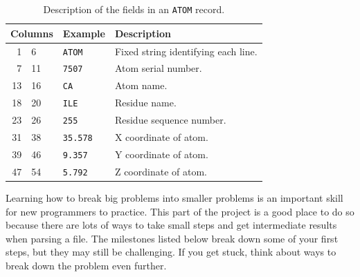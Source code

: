 \documentclass{article}
\begin{document}
\begin{table}[h]
\centering
\begin{tabular}{r@{ - }lcll}
\toprule
\multicolumn{3}{l}{Columns} & Example         & Description                         \\
\midrule
 1 &  6 & & \texttt{ATOM}   & Fixed string identifying each line. \\
 7 & 11 & & \texttt{7507}   & Atom serial number.                 \\
13 & 16 & & \texttt{CA}     & Atom name.                          \\
18 & 20 & & \texttt{ILE}    & Residue name.                       \\
23 & 26 & & \texttt{255}    & Residue sequence number.            \\
31 & 38 & & \texttt{35.578} & X coordinate of atom.               \\
39 & 46 & & \texttt{9.357}  & Y coordinate of atom.               \\
47 & 54 & & \texttt{5.792}  & Z coordinate of atom.               \\
\bottomrule
\end{tabular}
\caption{Description of the fields in an \texttt{ATOM} record.}
\label{tab:pdb-atom-record}
\end{table}

Learning how to break big problems into smaller problems is an important skill 
for new programmers to practice.  This part of the project is a good place to 
do so because there are lots of ways to take small steps and get intermediate 
results when parsing a file.  The milestones listed below break down some of 
your first steps, but they may still be challenging.  If you get stuck, think 
about ways to break down the problem even further.
\end{document}
